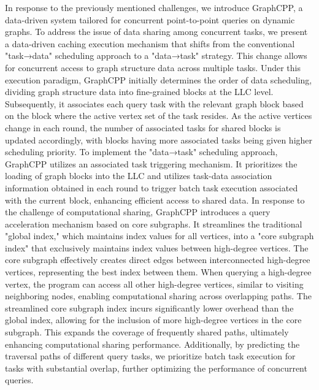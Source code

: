 \documentclass[lettersize,journal]{IEEEtran} %
\begin{document}
In response to the previously mentioned challenges, we introduce GraphCPP, a data-driven system tailored for concurrent point-to-point queries on dynamic graphs. To address the issue of data sharing among concurrent tasks, we present a data-driven caching execution mechanism that shifts from the conventional "task→data" scheduling approach to a "data→task" strategy. This change allows for concurrent access to graph structure data across multiple tasks. Under this execution paradigm, GraphCPP initially determines the order of data scheduling, dividing graph structure data into fine-grained blocks at the LLC level. Subsequently, it associates each query task with the relevant graph block based on the block where the active vertex set of the task resides. As the active vertices change in each round, the number of associated tasks for shared blocks is updated accordingly, with blocks having more associated tasks being given higher scheduling priority. To implement the "data→task" scheduling approach, GraphCPP utilizes an associated task triggering mechanism. It prioritizes the loading of graph blocks into the LLC and utilizes task-data association information obtained in each round to trigger batch task execution associated with the current block, enhancing efficient access to shared data. In response to the challenge of computational sharing, GraphCPP introduces a query acceleration mechanism based on core subgraphs. It streamlines the traditional "global index," which maintains index values for all vertices, into a "core subgraph index" that exclusively maintains index values between high-degree vertices. The core subgraph effectively creates direct edges between interconnected high-degree vertices, representing the best index between them. When querying a high-degree vertex, the program can access all other high-degree vertices, similar to visiting neighboring nodes, enabling computational sharing across overlapping paths. The streamlined core subgraph index incurs significantly lower overhead than the global index, allowing for the inclusion of more high-degree vertices in the core subgraph. This expands the coverage of frequently shared paths, ultimately enhancing computational sharing performance. Additionally, by predicting the traversal paths of different query tasks, we prioritize batch task execution for tasks with substantial overlap, further optimizing the performance of concurrent queries.
\end{document}

